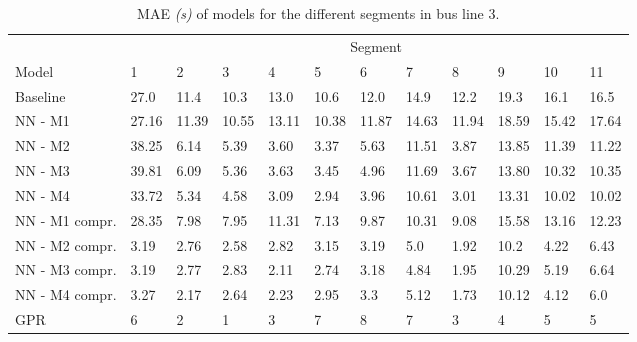 \begin{table}[H]
  \centering
  \caption{MAE \textit{(s)} of models for the different segments in bus line 3.}
  \label{tbl:model-mae-of-segs-203}
  \begin{adjustbox}{center}
  \begin{tabular}{ l | l | l | l | l | l | l | l | l | l | l | l }
    & \multicolumn{11}{c}{Segment} \\
    Model       & 1 & 2 & 3 & 4 & 5 & 6 & 7 & 8 & 9 & 10 & 11 \\
    \hline
    Baseline  & 27.0 & 11.4 & 10.3 & 13.0 & 10.6 & 12.0 & 14.9 & 12.2 & 19.3 & 16.1  & 16.5 \\
    NN - M1         & 27.16& 11.39& 10.55& 13.11& 10.38& 11.87& 14.63& 11.94& 18.59& 15.42& 17.64\\
    NN - M2         & 38.25 & 6.14 & 5.39 & 3.60 &  3.37 & 5.63 &  11.51 & 3.87 & 13.85 & 11.39  & 11.22\\
    NN - M3         & 39.81 & 6.09 & 5.36 & 3.63 &  3.45 & 4.96 &  11.69 & 3.67 & 13.80 & 10.32  & 10.35\\
    NN - M4         & 33.72 & 5.34 & 4.58 & 3.09 & 2.94 & 3.96 &  10.61 & 3.01 & 13.31 & 10.02  & 10.02\\
    NN - M1 compr.         & 28.35& 7.98& 7.95& 11.31& 7.13& 9.87& 10.31& 9.08& 15.58& 13.16& 12.23 \\ 
    NN - M2 compr.         & 3.19& 2.76& 2.58& 2.82& 3.15& 3.19& 5.0& 1.92& 10.2& 4.22& 6.43 \\
    NN - M3 compr.         & 3.19& 2.77& 2.83& 2.11& 2.74& 3.18& 4.84& 1.95& 10.29& 5.19& 6.64 \\
    NN - M4 compr.         & 3.27& 2.17& 2.64& 2.23& 2.95& 3.3& 5.12& 1.73& 10.12& 4.12& 6.0 \\
    GPR         & 6 & 2 & 1 & 3 &  7 & 8 &  7 & 3 & 4 & 5  & 5 \\
  \end{tabular}
  \end{adjustbox}
\end{table}

